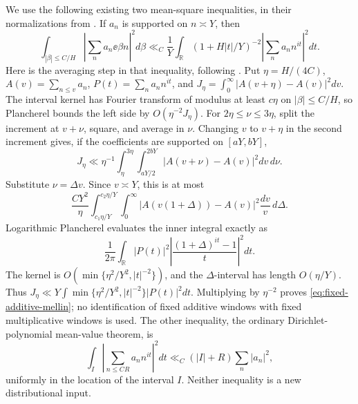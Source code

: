 We use the following existing two mean-square inequalities, in their
normalizations from \cite[Lemma 6.3 and (6.14)]{walsh}. If \(a_n\)
is supported on \(n\asymp Y\), then
\begin{equation}\label{eq:fixed-additive-mellin}
 \int_{|\beta|\le C/H}\left|\sum_na_n\ee{\beta n}\right|^2d\beta
 \ll_C\frac1Y\int_{\mathbb R}(1+H|t|/Y)^{-2}
                         \left|\sum_na_nn^{it}\right|^2dt.
\end{equation}
Here is the averaging step in that inequality, following
\cite[Lemmas 2.1--2.2]{soundararajan}. Put
\(\eta=H/(4C)\), \(A(v)=\sum_{n\le v}a_n\),
\(P(t)=\sum_na_nn^{it}\), and
\(J_\eta=\int_0^\infty|A(v+\eta)-A(v)|^2dv\).
The interval kernel has Fourier transform of modulus at least
\(c\eta\) on \(|\beta|\le C/H\), so Plancherel bounds the
left side by \(O(\eta^{-2}J_\eta)\).
For \(2\eta\le\nu\le3\eta\), split the increment at \(v+\nu\),
square, and average in \(\nu\). Changing \(v\) to \(v+\eta\)
in the second increment gives, if the coefficients are supported
on \([aY,bY]\),
\[
 J_\eta\ll\eta^{-1}\int_\eta^{3\eta}
       \int_{aY/2}^{2bY}|A(v+\nu)-A(v)|^2dv\,d\nu.
\]
Substitute \(\nu=\Delta v\). Since \(v\asymp Y\), this is at most
\[
 \frac{CY^2}{\eta}
 \int_{c_1\eta/Y}^{c_2\eta/Y}\int_0^\infty
       |A(v(1+\Delta))-A(v)|^2\frac{dv}{v}\,d\Delta.
\]
Logarithmic Plancherel evaluates the inner integral exactly as
\[
 \frac1{2\pi}\int_{\mathbb R}|P(t)|^2
          \left|\frac{(1+\Delta)^{it}-1}{t}\right|^2dt.
\]
The kernel is \(O(\min\{\eta^2/Y^2,|t|^{-2}\})\), and
the \(\Delta\)-interval has length \(O(\eta/Y)\). Thus
\(J_\eta\ll Y\int\min\{\eta^2/Y^2,|t|^{-2}\}|P(t)|^2dt\).
Multiplying by \(\eta^{-2}\) proves
\eqref{eq:fixed-additive-mellin}; no identification of fixed additive
windows with fixed multiplicative windows is used. The other inequality,
the ordinary Dirichlet-polynomial mean-value theorem, is
\begin{equation}\label{eq:fixed-dirichlet-mean}
 \int_I\left|\sum_{n\le CR}a_nn^{it}\right|^2dt
              \ll_C (|I|+R)\sum_n|a_n|^2,
\end{equation}
uniformly in the location of the interval \(I\). Neither inequality
is a new distributional input.

